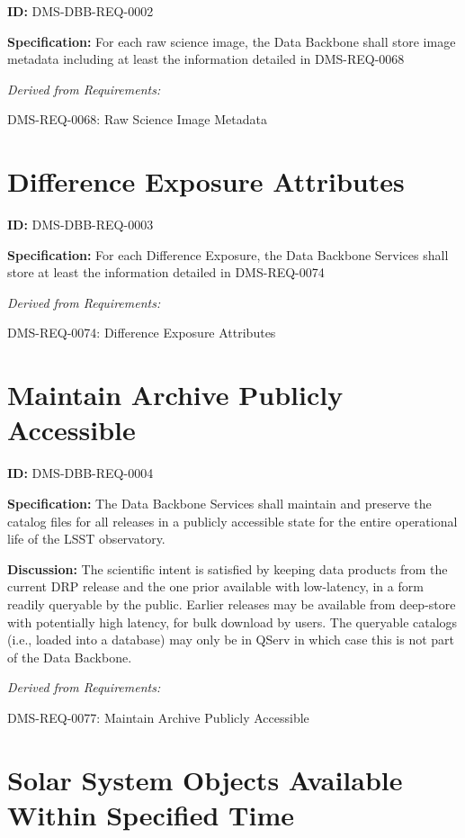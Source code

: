 \documentclass[SE,toc,lsstdraft]{lsstdoc}
\begin{document}
\label{DMS-DBB-REQ-0002}
\textbf{ID:} DMS-DBB-REQ-0002

\textbf{Specification:}
For each raw science image, the Data Backbone shall store image metadata including at least the information detailed in DMS-REQ-0068

\emph{Derived from Requirements:}

DMS-REQ-0068:
Raw Science Image Metadata \newline

\section{Difference Exposure Attributes}

\label{DMS-DBB-REQ-0003}
\textbf{ID:} DMS-DBB-REQ-0003

\textbf{Specification:}
For each Difference Exposure, the Data Backbone Services shall store at least the information detailed in DMS-REQ-0074

\emph{Derived from Requirements:}

DMS-REQ-0074:
Difference Exposure Attributes \newline

\section{Maintain Archive Publicly Accessible}

\label{DMS-DBB-REQ-0004}
\textbf{ID:} DMS-DBB-REQ-0004

\textbf{Specification:}
The Data Backbone Services shall maintain and preserve the catalog files for all releases in a publicly accessible state for the entire operational life of the LSST observatory.

\textbf{Discussion:}
The scientific intent is satisfied by keeping data products from the current DRP release and the one prior available with low-latency, in a form readily queryable by the public. Earlier releases may be available from deep-store with potentially high latency, for bulk download by users.    The queryable catalogs (i.e., loaded into a database) may only be in QServ in which case this is not part of the Data Backbone.

\emph{Derived from Requirements:}

DMS-REQ-0077:
Maintain Archive Publicly Accessible \newline

\section{Solar System Objects Available Within Specified Time}
\end{document}

